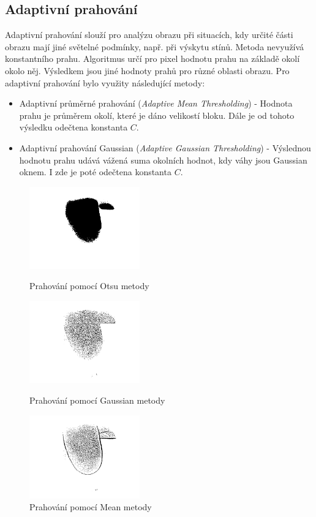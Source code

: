 \subsection{Adaptivní prahování}
Adaptivní prahování slouží pro analýzu obrazu při situacích, kdy určité části obrazu mají jiné světelné podmínky, např. při výskytu stínů. Metoda nevyužívá konstantního prahu. Algoritmus určí pro pixel hodnotu prahu na základě okolí okolo něj. Výsledkem jsou jiné hodnoty prahů pro různé oblasti obrazu. Pro adaptivní prahování bylo využity následující metody: \cite{OpenCVTresholding}
\begin{itemize}
    \item Adaptivní průměrné prahování (\textit{Adaptive Mean Thresholding}) - Hodnota prahu je průměrem okolí, které je dáno velikostí bloku. Dále je od tohoto výsledku odečtena konstanta $C$.
    \item Adaptivní prahování Gaussian (\textit{Adaptive Gaussian Thresholding}) - Výslednou hodnotu prahu udává vážená suma okolních hodnot, kdy váhy jsou Gaussian oknem. I zde je poté odečtena konstanta $C$.
\end{itemize}

\begin{figure}[!htbp]
  \begin{minipage}[b]{0.3\linewidth}
    \centering
    \includegraphics[width=180px]{obrazky-figures/live25otsu.png}
    \caption{Prahování pomocí Otsu metody}
  \end{minipage}
  \hspace{0.3cm}
  \begin{minipage}[b]{0.3\linewidth}
    \centering
    \includegraphics[width=180px]{obrazky-figures/live25gauss.png}
    \caption{Prahování pomocí Gaussian metody}
  \end{minipage}
  \hspace{0.3cm}
    \begin{minipage}[b]{0.3\linewidth}
    \centering
    \includegraphics[width=180px]{obrazky-figures/live25mean.png}
    \caption{Prahování pomocí Mean metody}
  \end{minipage}
\end{figure}
